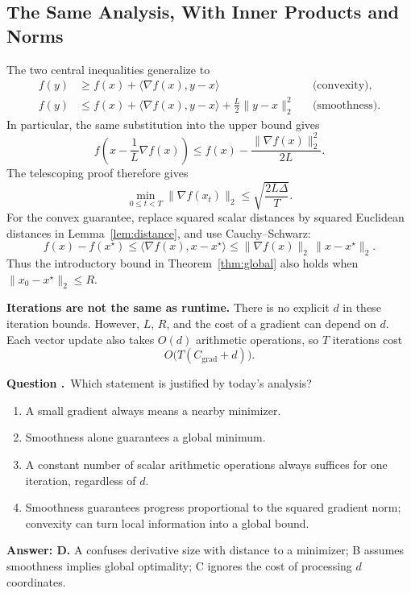 \documentclass[11pt,letterpaper]{article}
\theoremstyle{definition}
\theoremstyle{plain}
\newcounter{question}
\newenvironment{Qu}{%
  \par\medskip\refstepcounter{question}
  \noindent\textbf{Question \thequestion.}\ }{\par\medskip}
\newcommand{\QU}{\begin{Qu}}
\newcommand{\aitem}{\item[\textbf{(A)}]}
\newcommand{\bitem}{\item[\textbf{(B)}]}
\newcommand{\citem}{\item[\textbf{(C)}]}
\newcommand{\ditem}{\item[\textbf{(D)}]}
\newcommand{\xstar}{x^\star}
\begin{document}
\newpage
\subsection{The Same Analysis, With Inner Products and Norms}

The two central inequalities generalize to
\begin{align*}
 f(y)&\geq f(x)+\langle\nabla f(x),y-x\rangle
          &&\text{(convexity)},\\
 f(y)&\leq f(x)+\langle\nabla f(x),y-x\rangle
                  +\frac L2\|y-x\|_2^2
          &&\text{(smoothness)}.
\end{align*}
In particular, the same substitution into the upper bound gives
\[
 f\left(x-\frac1L\nabla f(x)\right)
 \leq f(x)-\frac{\|\nabla f(x)\|_2^2}{2L}.
\]
The telescoping proof therefore gives
\[
  \min_{0\leq t<T}\|\nabla f(x_t)\|_2
  \leq\sqrt{\frac{2L\Delta}{T}}.
\]
For the convex guarantee, replace squared scalar distances by squared
Euclidean distances in Lemma~\ref{lem:distance}, and use Cauchy--Schwarz:
\[
  f(x)-f(\xstar)
  \leq\langle\nabla f(x),x-\xstar\rangle
  \leq\|\nabla f(x)\|_2\,\|x-\xstar\|_2.
\]
Thus the introductory bound in Theorem~\ref{thm:global} also holds when
$\|x_0-\xstar\|_2\leq R$.

\textbf{Iterations are not the same as runtime.} There is no explicit $d$
in these iteration bounds. However, $L$, $R$, and the cost of a gradient
can depend on $d$. Each vector update also takes $O(d)$ arithmetic
operations, so $T$ iterations cost
\[
  O\bigl(T(C_{\mathrm{grad}}+d)\bigr).
\]

\QU Which statement is justified by today's analysis?
\begin{enumerate}
  \aitem A small gradient always means a nearby minimizer.
  \bitem Smoothness alone guarantees a global minimum.
  \citem A constant number of scalar arithmetic operations always suffices
  for one iteration, regardless of $d$.
  \ditem Smoothness guarantees progress proportional to the squared
  gradient norm; convexity can turn local information into a global bound.
\end{enumerate}
\end{Qu}
\begin{answer}
\textbf{Answer: D.} A confuses derivative size with distance to a
minimizer; B assumes smoothness implies global optimality; C ignores the
cost of processing $d$ coordinates.
\end{answer}
\end{document}
